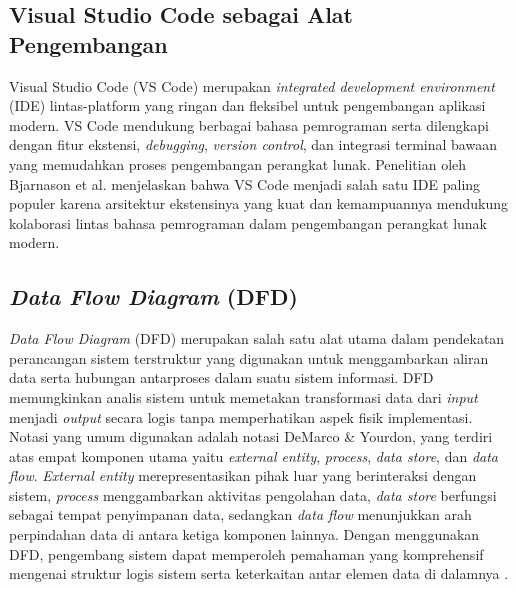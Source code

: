 \subsection{Visual Studio Code sebagai Alat Pengembangan} \label{II.VSCode}
Visual Studio Code (VS Code) merupakan \textit{integrated development environment} (IDE) lintas-platform yang ringan dan fleksibel untuk pengembangan aplikasi modern. VS Code mendukung berbagai bahasa pemrograman serta dilengkapi dengan fitur ekstensi, \textit{debugging}, \textit{version control}, dan integrasi terminal bawaan yang memudahkan proses pengembangan perangkat lunak. Penelitian oleh Bjarnason et al. \cite{bjarnason2023empirically2} menjelaskan bahwa VS Code menjadi salah satu IDE paling populer karena arsitektur ekstensinya yang kuat dan kemampuannya mendukung kolaborasi lintas bahasa pemrograman dalam pengembangan perangkat lunak modern.\par

\subsection{\textit{Data Flow Diagram} (DFD)} \label{II.DFD}
\textit{Data Flow Diagram} (DFD) merupakan salah satu alat utama dalam pendekatan perancangan sistem terstruktur yang digunakan untuk menggambarkan aliran data serta hubungan antarproses dalam suatu sistem informasi. DFD memungkinkan analis sistem untuk memetakan transformasi data dari \textit{input} menjadi \textit{output} secara logis tanpa memperhatikan aspek fisik implementasi. Notasi yang umum digunakan adalah notasi DeMarco \& Yourdon, yang terdiri atas empat komponen utama yaitu \textit{external entity}, \textit{process}, \textit{data store}, dan \textit{data flow}. \textit{External entity} merepresentasikan pihak luar yang berinteraksi dengan sistem, \textit{process} menggambarkan aktivitas pengolahan data, \textit{data store} berfungsi sebagai tempat penyimpanan data, sedangkan \textit{data flow} menunjukkan arah perpindahan data di antara ketiga komponen lainnya. Dengan menggunakan DFD, pengembang sistem dapat memperoleh pemahaman yang komprehensif mengenai struktur logis sistem serta keterkaitan antar elemen data di dalamnya \cite{singgalen2021perkembangan}.\par

